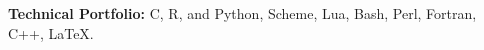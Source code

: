 \begin{cvparagraph}


\end{cvparagraph}



  {\bfseries Technical Portfolio:} C, R, and Python, Scheme, Lua, Bash, Perl, Fortran, C++, \LaTeX{}.

